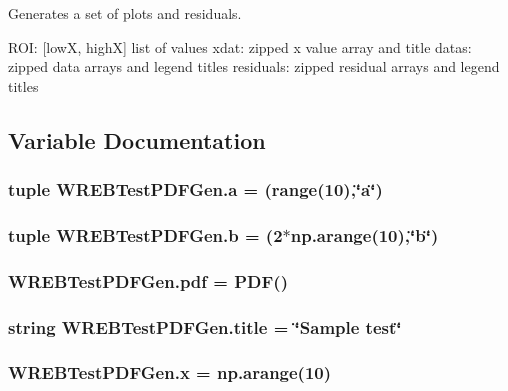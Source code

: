 Generates a set of plots and residuals. 

R\+OI\+: \mbox{[}lowX, highX\mbox{]} list of values xdat\+: zipped x value array and title datas\+: zipped data arrays and legend titles residuals\+: zipped residual arrays and legend titles 

\subsection{Variable Documentation}
\subsubsection[{\texorpdfstring{a}{a}}]{\setlength{\rightskip}{0pt plus 5cm}tuple W\+R\+E\+B\+Test\+P\+D\+F\+Gen.\+a = (range(10),\char`\"{}a\char`\"{})}\hypertarget{namespace_w_r_e_b_test_p_d_f_gen_ab4374e5266c2f724fd7a3a7878e6fcaa}{}\label{namespace_w_r_e_b_test_p_d_f_gen_ab4374e5266c2f724fd7a3a7878e6fcaa}
\subsubsection[{\texorpdfstring{b}{b}}]{\setlength{\rightskip}{0pt plus 5cm}tuple W\+R\+E\+B\+Test\+P\+D\+F\+Gen.\+b = (2$\ast$np.\+arange(10),\char`\"{}b\char`\"{})}\hypertarget{namespace_w_r_e_b_test_p_d_f_gen_aef838e878ef1e565abfec7795aa8a5f8}{}\label{namespace_w_r_e_b_test_p_d_f_gen_aef838e878ef1e565abfec7795aa8a5f8}
\subsubsection[{\texorpdfstring{pdf}{pdf}}]{\setlength{\rightskip}{0pt plus 5cm}W\+R\+E\+B\+Test\+P\+D\+F\+Gen.\+pdf = {\bf P\+DF}()}\hypertarget{namespace_w_r_e_b_test_p_d_f_gen_a64363c505fb5c374377e1adc4dc5a1dd}{}\label{namespace_w_r_e_b_test_p_d_f_gen_a64363c505fb5c374377e1adc4dc5a1dd}
\subsubsection[{\texorpdfstring{title}{title}}]{\setlength{\rightskip}{0pt plus 5cm}string W\+R\+E\+B\+Test\+P\+D\+F\+Gen.\+title = \char`\"{}Sample test\char`\"{}}\hypertarget{namespace_w_r_e_b_test_p_d_f_gen_ae72a383e54deb3fda5db73aaf0c505e6}{}\label{namespace_w_r_e_b_test_p_d_f_gen_ae72a383e54deb3fda5db73aaf0c505e6}
\subsubsection[{\texorpdfstring{x}{x}}]{\setlength{\rightskip}{0pt plus 5cm}W\+R\+E\+B\+Test\+P\+D\+F\+Gen.\+x = np.\+arange(10)}\hypertarget{namespace_w_r_e_b_test_p_d_f_gen_a8ca66897d8a913ee8a2144675314591b}{}\label{namespace_w_r_e_b_test_p_d_f_gen_a8ca66897d8a913ee8a2144675314591b}
